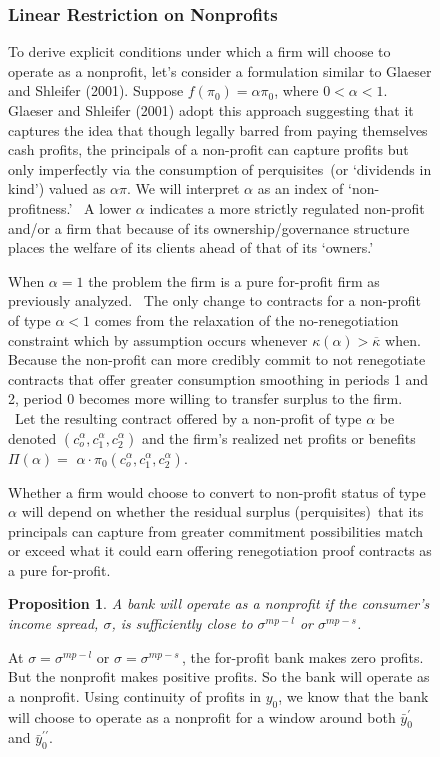 \documentclass[11pt]{article}%
\newtheorem{proposition}{Proposition}
\begin{document}
\begin{figure}
{\subsubsection{Linear Restriction on Nonprofits}

To derive explicit conditions under which a firm will choose to operate as a
nonprofit, let's consider a formulation similar to Glaeser and Shleifer
(2001). Suppose $f\left(  \pi_{0}\right)  =\alpha\pi_{0}$, where $0<\alpha<1$.
Glaeser and Shleifer (2001) adopt this approach suggesting that it captures
the idea that though legally barred from paying themselves cash profits, the
principals of a non-profit can capture profits but only imperfectly via the
consumption of perquisites\ (or `dividends in kind') valued as $\alpha\pi.$ We
will interpret $\alpha$ as an index of `non-profitness.' \ A lower $\alpha$
indicates a more strictly regulated non-profit and/or a firm that because of
its ownership/governance structure places the welfare of its clients ahead of
that of its `owners.'

When $\alpha=1$ the problem the firm is a pure for-profit firm as previously
analyzed. \ The only change to contracts for a non-profit of type $\alpha<1$
comes from the relaxation of the no-renegotiation constraint which by
assumption occurs whenever $\kappa(\alpha)>\overline{\kappa}$ when. Because
the non-profit can more credibly commit to not renegotiate contracts that
offer greater consumption smoothing in periods 1 and 2, period 0 becomes more
willing to transfer surplus to the firm. \ Let the resulting contract offered
by a non-profit of type $\alpha$ be denoted $\left(  c_{o}^{\alpha}%
,c_{1}^{\alpha},c_{2}^{\alpha}\right)  $ and the firm's realized net profits
or benefits $\Pi(\alpha)=$ $\alpha\cdot\pi_{0}\left(  c_{o}^{\alpha}%
,c_{1}^{\alpha},c_{2}^{\alpha}\right)  .$

Whether a firm would choose to convert to non-profit status of type $\alpha$
will depend on whether the residual surplus (perquisites)\ that its principals
can capture from greater commitment possibilities match or exceed what it
could earn offering renegotiation proof contracts as a pure for-profit.

\begin{proposition}
A bank will operate as a nonprofit if the consumer's income spread, $\sigma$,
is sufficiently close to $\sigma^{mp-l}$ or $\sigma^{mp-s}$.
\end{proposition}

At $\sigma=\sigma^{mp-l}$ or $\sigma=\sigma^{mp-s}\,$, the for-profit bank
makes zero profits. But the nonprofit makes positive profits. So the bank will
operate as a nonprofit. Using continuity of profits in $y_{0}$, we know that
the bank will choose to operate as a nonprofit for a window around both
$\bar{y}_{0}^{\prime}$ and $\bar{y}_{0}^{\prime\prime}$.

}
\end{figure}
\end{document}
